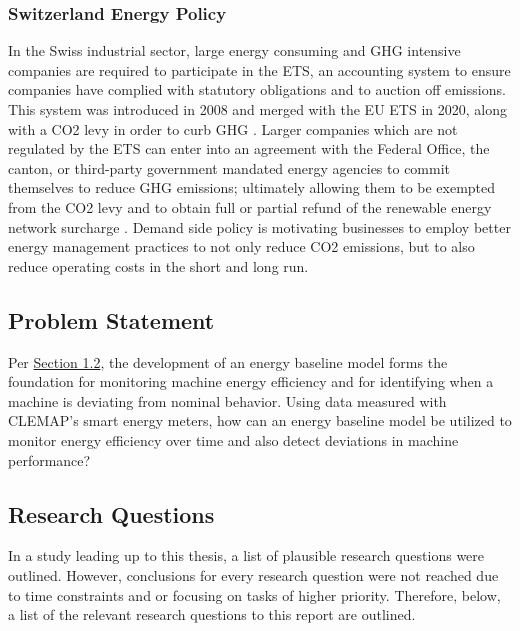 \subsubsection{Switzerland Energy Policy}
In the Swiss industrial sector, large energy consuming and \ac{GHG} intensive companies are required to participate in the \ac{ETS}, an accounting system to ensure companies have complied with statutory obligations and to auction off emissions. This system was introduced in 2008 and merged with the \ac{EU} ETS in 2020, along with a \ac{CO2} levy in order to curb GHG \cite{carbon_trading}. Larger companies which are not regulated by the ETS can enter into an agreement with the Federal Office, the canton, or third-party government mandated energy agencies to commit themselves to reduce GHG emissions; ultimately allowing them to be exempted from the CO2 levy and to obtain full or partial refund of the renewable energy network surcharge \cite{optional}. Demand side policy is motivating businesses to employ better energy management practices to not only reduce CO2 emissions, but to also reduce operating costs in the short and long run. 

\subsection{Problem Statement}

Per \hyperlink{subsection.1.2}{Section 1.2}, the development of an energy baseline model forms the foundation for monitoring machine energy efficiency and for identifying when a machine is deviating from nominal behavior. Using data measured with CLEMAP's smart energy meters, how can an energy baseline model be utilized to monitor energy efficiency over time and also detect deviations in machine performance?

\subsection{Research Questions}

In a study leading up to this thesis, a list of plausible research questions were outlined. However, conclusions for every research question were not reached due to time constraints and or focusing on tasks of higher priority. Therefore, below, a list of the relevant research questions to this report are outlined. 

